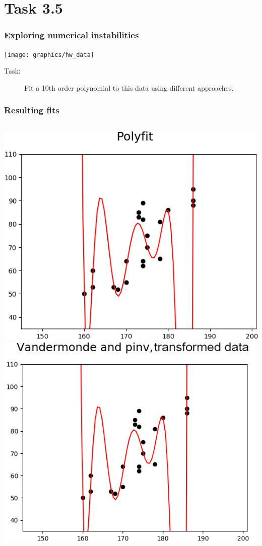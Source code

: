 \documentclass{beamer}
\begin{document}
\section{Task 3.5}
\begin{frame}
	\frametitle{Exploring numerical instabilities}
	\centering\texttt{[image: graphics/hw\_data]}
	\begin{description}
	\item[Task:] Fit a 10th order polynomial to this data using different approaches.
	\end{description}
\end{frame}

\begin{frame}
	\frametitle{Resulting fits}
	\vspace{0.2cm}
	\begin{columns}[t]
		\centering
		\includegraphics[width=0.9\linewidth]{graphics/polyfit_mark}\\
		\vspace{0.2cm}
		\includegraphics[width=0.9\linewidth]{graphics/polyvander_pinv_transformed_mark}

\end{columns}
\end{frame}
\end{document}
